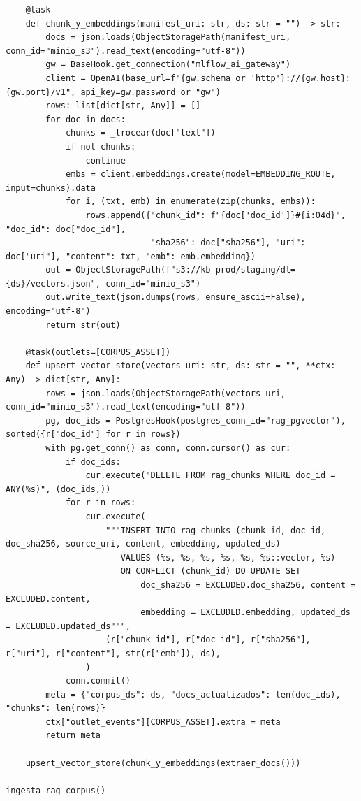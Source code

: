 \begin{lstlisting}
    @task
    def chunk_y_embeddings(manifest_uri: str, ds: str = "") -> str:
        docs = json.loads(ObjectStoragePath(manifest_uri, conn_id="minio_s3").read_text(encoding="utf-8"))
        gw = BaseHook.get_connection("mlflow_ai_gateway")
        client = OpenAI(base_url=f"{gw.schema or 'http'}://{gw.host}:{gw.port}/v1", api_key=gw.password or "gw")
        rows: list[dict[str, Any]] = []
        for doc in docs:
            chunks = _trocear(doc["text"])
            if not chunks:
                continue
            embs = client.embeddings.create(model=EMBEDDING_ROUTE, input=chunks).data
            for i, (txt, emb) in enumerate(zip(chunks, embs)):
                rows.append({"chunk_id": f"{doc['doc_id']}#{i:04d}", "doc_id": doc["doc_id"],
                             "sha256": doc["sha256"], "uri": doc["uri"], "content": txt, "emb": emb.embedding})
        out = ObjectStoragePath(f"s3://kb-prod/staging/dt={ds}/vectors.json", conn_id="minio_s3")
        out.write_text(json.dumps(rows, ensure_ascii=False), encoding="utf-8")
        return str(out)

    @task(outlets=[CORPUS_ASSET])
    def upsert_vector_store(vectors_uri: str, ds: str = "", **ctx: Any) -> dict[str, Any]:
        rows = json.loads(ObjectStoragePath(vectors_uri, conn_id="minio_s3").read_text(encoding="utf-8"))
        pg, doc_ids = PostgresHook(postgres_conn_id="rag_pgvector"), sorted({r["doc_id"] for r in rows})
        with pg.get_conn() as conn, conn.cursor() as cur:
            if doc_ids:
                cur.execute("DELETE FROM rag_chunks WHERE doc_id = ANY(%s)", (doc_ids,))
            for r in rows:
                cur.execute(
                    """INSERT INTO rag_chunks (chunk_id, doc_id, doc_sha256, source_uri, content, embedding, updated_ds)
                       VALUES (%s, %s, %s, %s, %s, %s::vector, %s)
                       ON CONFLICT (chunk_id) DO UPDATE SET
                           doc_sha256 = EXCLUDED.doc_sha256, content = EXCLUDED.content,
                           embedding = EXCLUDED.embedding, updated_ds = EXCLUDED.updated_ds""",
                    (r["chunk_id"], r["doc_id"], r["sha256"], r["uri"], r["content"], str(r["emb"]), ds),
                )
            conn.commit()
        meta = {"corpus_ds": ds, "docs_actualizados": len(doc_ids), "chunks": len(rows)}
        ctx["outlet_events"][CORPUS_ASSET].extra = meta
        return meta

    upsert_vector_store(chunk_y_embeddings(extraer_docs()))

ingesta_rag_corpus()
\end{lstlisting}

